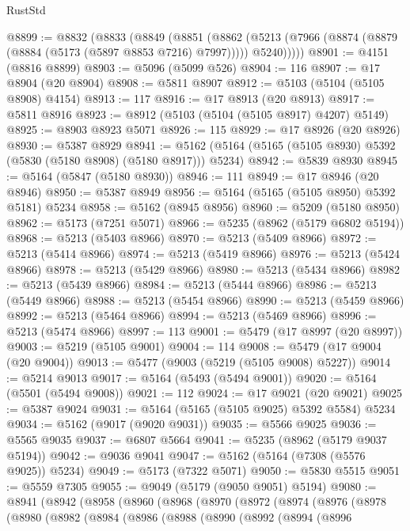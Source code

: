 \begin{lexlean}{RustStd}
\begin{coremodule}
@8899 := @8832
    (@8833
      (@8849
        (@8851
          (@8862 (@5213 (@7966 (@8874 (@8879 (@8884 (@5173 (@5897 @8853 @7216) @7997))))) @5240)))))
@8901 := @4151 (@8816 @8899)
@8903 := @5096 (@5099 @526)
@8904 := 116
@8907 := @17 @8904 (@20 @8904)
@8908 := @5811 @8907
@8912 := @5103 (@5104 (@5105 @8908) @4154)
@8913 := 117
@8916 := @17 @8913 (@20 @8913)
@8917 := @5811 @8916
@8923 := @8912 (@5103 (@5104 (@5105 @8917) @4207) @5149)
@8925 := @8903 @8923 @5071
@8926 := 115
@8929 := @17 @8926 (@20 @8926)
@8930 := @5387 @8929
@8941 := @5162 (@5164 (@5165 (@5105 @8930) @5392 (@5830 (@5180 @8908) (@5180 @8917))) @5234)
@8942 := @5839 @8930
@8945 := @5164 (@5847 (@5180 @8930))
@8946 := 111
@8949 := @17 @8946 (@20 @8946)
@8950 := @5387 @8949
@8956 := @5164 (@5165 (@5105 @8950) @5392 @5181) @5234
@8958 := @5162 (@8945 @8956)
@8960 := @5209 (@5180 @8950)
@8962 := @5173 (@7251 @5071)
@8966 := @5235 (@8962 (@5179 @6802 @5194))
@8968 := @5213 (@5403 @8966)
@8970 := @5213 (@5409 @8966)
@8972 := @5213 (@5414 @8966)
@8974 := @5213 (@5419 @8966)
@8976 := @5213 (@5424 @8966)
@8978 := @5213 (@5429 @8966)
@8980 := @5213 (@5434 @8966)
@8982 := @5213 (@5439 @8966)
@8984 := @5213 (@5444 @8966)
@8986 := @5213 (@5449 @8966)
@8988 := @5213 (@5454 @8966)
@8990 := @5213 (@5459 @8966)
@8992 := @5213 (@5464 @8966)
@8994 := @5213 (@5469 @8966)
@8996 := @5213 (@5474 @8966)
@8997 := 113
@9001 := @5479 (@17 @8997 (@20 @8997))
@9003 := @5219 (@5105 @9001)
@9004 := 114
@9008 := @5479 (@17 @9004 (@20 @9004))
@9013 := @5477 (@9003 (@5219 (@5105 @9008) @5227))
@9014 := @5214 @9013
@9017 := @5164 (@5493 (@5494 @9001))
@9020 := @5164 (@5501 (@5494 @9008))
@9021 := 112
@9024 := @17 @9021 (@20 @9021)
@9025 := @5387 @9024
@9031 := @5164 (@5165 (@5105 @9025) @5392 @5584) @5234
@9034 := @5162 (@9017 (@9020 @9031))
@9035 := @5566 @9025
@9036 := @5565 @9035
@9037 := @6807 @5664
@9041 := @5235 (@8962 (@5179 @9037 @5194))
@9042 := @9036 @9041
@9047 := @5162 (@5164 (@7308 (@5576 @9025)) @5234)
@9049 := @5173 (@7322 @5071)
@9050 := @5830 @5515
@9051 := @5559 @7305
@9055 := @9049 (@5179 (@9050 @9051) @5194)
@9080 := @8941
    (@8942
      (@8958
        (@8960
          (@8968
            (@8970
              (@8972
                (@8974
                  (@8976
                    (@8978
                      (@8980
                        (@8982
                          (@8984
                            (@8986
                              (@8988
                                (@8990
                                  (@8992
                                    (@8994
                                      (@8996

\end{coremodule}
\end{lexlean}
